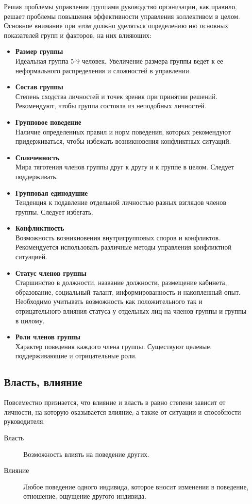 \documentclass[a4paper,12pt,oneside,final]{extarticle}
\numberwithin{equation}{section}
\begin{document}
Решая проблемы управления группами руководство организации, как правило, решает проблемы повышения эффективности управления коллективом в целом. 
Основное внимание при этом должно уделяться определению ню основных показателей групп и факторов, на них влияющих:
\begin{itemize}
	\item \textbf{Размер группы} \\
	Идеальная группа 5-9 человек. 
	Увеличение размера группы ведет к ее неформального распределения и сложностей в управлении.
	\item \textbf{Состав группы} \\
	Степень сходства личностей и точек зрения при принятии решений. 
	Рекомендуют, чтобы группа состояла из неподобных личностей.
	\item \textbf{Групповое поведение} \\
	Наличие определенных правил и норм поведения, которых рекомендуют придерживаться, чтобы избежать возникновения конфликтных ситуаций.
	\item \textbf{Сплоченность} \\
	Мира тяготения членов группы друг к другу и к группе в целом. 
	Следует поддерживать.
	\item \textbf{Групповая единодушие} \\
	Тенденция к подавление отдельной личностью разных взглядов членов группы. 
	Следует избегать.
	\item \textbf{Конфликтность} \\
	Возможность возникновения внутригрупповых споров и конфликтов. 
	Рекомендуется использовать различные методы управления конфликтной ситуацией.
	\item \textbf{Статус членов группы} \\
	Старшинство в должности, название должности, размещение кабинета, образование, социальный талант, информированность и накопленный опыт. 
	Необходимо учитывать возможность как положительного так и отрицательного влияния статуса у отдельных лиц на членов группы и группы в цилому.
	\item \textbf{Роли членов группы} \\
	Характер поведения каждого члена группы.
	Существуют целевые, поддерживающие и отрицательные роли.
\end{itemize}

\subsection{Власть, влияние}
Повсеместно признается, что влияние и власть в равно степени зависит от личности, на которую оказывается влияние, а также от ситуации и способности руководителя.
\begin{description}
\item[Власть] Возможность влиять на поведение других.
\item[Влияние] Любое поведение одного индивида, которое вносит изменения в поведение, отношение, ощущение другого индивида.
\end{description}
\end{document}
